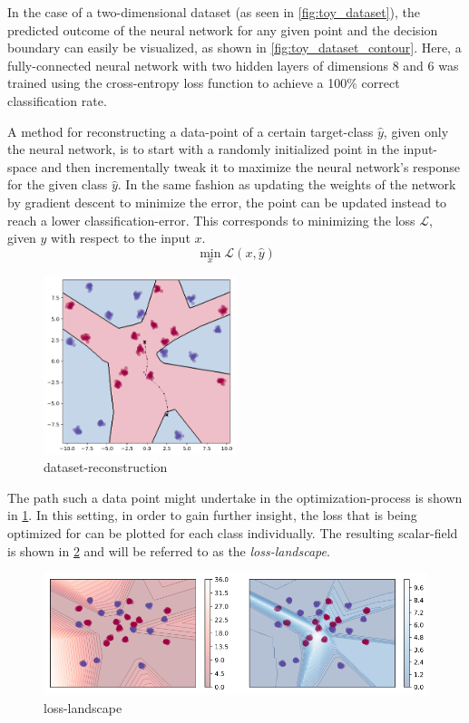 In the case of a two-dimensional dataset (as seen in \ref{fig:toy_dataset}), the predicted outcome of the neural network for any given point and the decision boundary can easily be visualized, as shown in \ref{fig:toy_dataset_contour}.
Here, a fully-connected neural network with two hidden layers of dimensions 8 and 6 was trained using the cross-entropy loss function to achieve a 100\% correct classification rate.

A method for reconstructing a data-point of a certain target-class $\hat y$, given only the neural network, is to start with a randomly initialized point in the input-space and then incrementally tweak it to maximize the neural network's response for the given class $\hat y$. In the same fashion as updating the weights of the network by gradient descent to minimize the error, the point can be updated instead to reach a lower classification-error.
This corresponds to minimizing the loss $\mathcal L$, given $\hat y$  with respect to the input $x$.
$$\min_x \mathcal L (x,\hat y)
$$

\begin{figure}
\centering
\includegraphics[width=0.5\textwidth]{Figures/toy_dataset_invert.png}
\decoRule
\caption{dataset-reconstruction}
\label{fig:toy_dataset_invert}
\end{figure}

The path such a data point might undertake in the optimization-process is shown in \ref{fig:toy_dataset_invert}.
In this setting, in order to gain further insight, the loss that is being optimized for can be plotted for each class individually. The resulting scalar-field is shown in  \ref{fig:toy_dataset_loss_landscape} and will be referred to as the \textit{loss-landscape}.

\begin{figure}
\centering
\includegraphics[width=\textwidth]{Figures/toy_dataset_loss_landscape.png}
\decoRule
\caption{loss-landscape}
\label{fig:toy_dataset_loss_landscape}
\end{figure}

